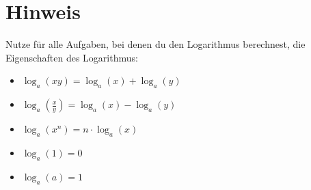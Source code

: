 \section*{\small Hinweis}
Nutze für alle Aufgaben, bei denen du den Logarithmus berechnest, die Eigenschaften des Logarithmus:
\begin{itemize}
    \item \( \log_{a}(xy) = \log_{a}(x) + \log_{a}(y) \)
    \item \( \log_{a}\left(\frac{x}{y}\right) = \log_{a}(x) - \log_{a}(y) \)
    \item \( \log_{a}(x^n) = n \cdot \log_{a}(x) \)
    \item \( \log_{a}(1) = 0 \)
    \item \( \log_{a}(a) = 1 \)
\end{itemize}
